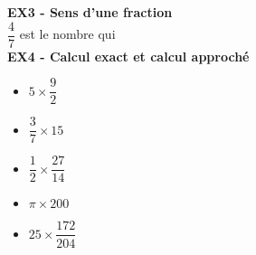 \textbf{EX3 - Sens d'une fraction}\\

$\dfrac{4}{7}$ est le nombre qui \dotfill \\

\textbf{EX4 - Calcul exact et calcul approché}\\

\begin{itemize}[label={$\bullet$}]
  \item $5 \times \dfrac{9}{2} $ \dotfill \\
  \item $\dfrac{3}{7} \times 15 $  \dotfill \\
  \item $\dfrac{1}{2} \times \dfrac{27}{14} $  \dotfill \\
  \item $\pi \times 200 $  \dotfill \\
  \item $25 \times \dfrac{172}{204} $  \dotfill \\
\end{itemize}



